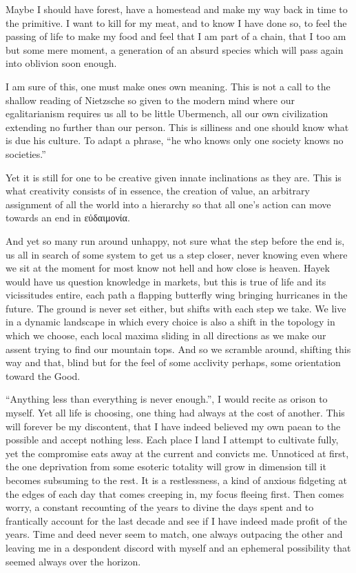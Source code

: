 \documentclass[ebook, 10pt, openright, onecolumn]{memoir}
\newcommand{\textgreek}[1]{\begingroup\fontencoding{LGR}\selectfont#1\endgroup}
\begin{document}
Maybe I should have forest, have a homestead and make my way back in time to the
primitive.  I want to kill for my meat, and to know I have done so, to feel the
passing of life to make my food and feel that I am part of a chain, that I too
am but some mere moment, a generation of an absurd species which will pass again
into oblivion soon enough.

I am sure of this, one must make ones own meaning.  This is not a call to the
shallow reading of Nietzsche so given to the modern mind where our
egalitarianism requires us all to be little Ubermench, all our own civilization
extending no further than our person.  This is silliness and one should know
what is due his culture.  To adapt a phrase, ``he who knows only one society knows
no societies.''

Yet it is still for one to be creative given innate inclinations as they are.
This is what creativity consists of in essence, the creation of value, an
arbitrary assignment of all the world into a hierarchy so that all one's action
can move towards an end in \textgreek{εὐδαιμονία}.

And yet so many run around unhappy, not sure what the step before the end is, us
all in search of some system to get us a step closer, never knowing even where
we sit at the moment for most know not hell and how close is heaven.  Hayek
would have us question knowledge in markets, but this is true of life and its
vicissitudes entire, each path a flapping butterfly wing bringing hurricanes in
the future. The ground is never set either, but shifts with each step we take.
We live in a dynamic landscape in which every choice is also a shift in the
topology in which we choose, each local maxima sliding in all directions as we
make our assent trying to find our mountain tops.  And so we scramble around,
shifting this way and that, blind but for the feel of some acclivity perhaps,
some orientation toward the Good.

``Anything less than everything is never enough.'', I would recite as orison to
myself.  Yet all life is choosing, one thing had always at the cost of another.
This will forever be my discontent, that I have indeed believed my own paean to
the possible and accept nothing less.  Each place I land I attempt to cultivate
fully, yet the compromise eats away at the current and convicts me.  Unnoticed
at first, the one deprivation from some esoteric totality will grow in dimension
till it becomes subsuming to the rest.  It is a restlessness, a kind of anxious
fidgeting at the edges of each day that comes creeping in, my focus fleeing
first.  Then comes worry, a constant recounting of the years to divine the days
spent and to frantically account for the last decade and see if I have indeed
made profit of the years.  Time and deed never seem to match, one always
outpacing the other and leaving me in a despondent discord with myself and an
ephemeral possibility that seemed always over the horizon.
\end{document}
